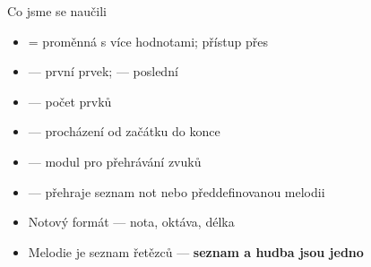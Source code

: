\begin{frame}{Co jsme se naučili}
  \begin{itemize}
    \item[\checkmark]  = proměnná s více hodnotami; přístup přes 
    \item[\checkmark]  — první prvek;  — poslední
    \item[\checkmark]  — počet prvků
    \item[\checkmark]  — procházení od začátku do konce
    \item[\checkmark]  — modul pro přehrávání zvuků
    \item[\checkmark]  — přehraje seznam not nebo předdefinovanou melodii
    \item[\checkmark] Notový formát  — nota, oktáva, délka
    \item[\checkmark] Melodie je seznam řetězců — \textbf{seznam a hudba jsou jedno}
  \end{itemize}
\end{frame}


